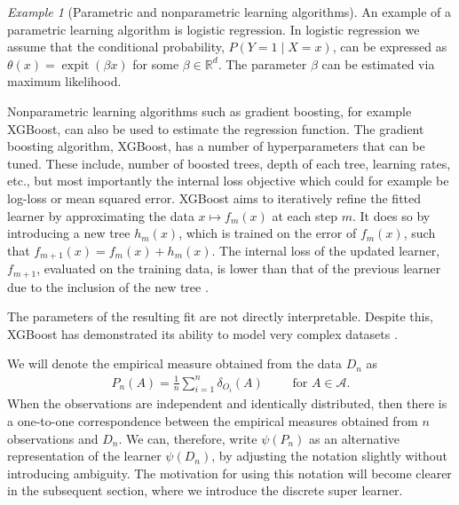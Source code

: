 \documentclass[11pt, a4paper]{article}
\theoremstyle{definition}
\theoremstyle{remark}
\newtheorem{example}{Example}
\newcommand{\btheta}{\theta}
\newcommand{\la}{\psi}
\DeclareMathOperator{\expit}{expit}
\begin{document}
\begin{example}[Parametric and nonparametric learning algorithms]
    An example of a parametric learning algorithm is logistic regression. In logistic regression we assume that the conditional probability, $ P(Y = 1 \mid X = x) $, can be expressed as $ \btheta(x) = \expit( \beta x) $ for some $ \beta \in \mathbb{R}^{d} $. The parameter $ \beta $ can be estimated via maximum likelihood.   

Nonparametric learning algorithms such as gradient boosting, for example XGBoost, can also be used to estimate the regression function. The gradient boosting algorithm, XGBoost, has a number of hyperparameters that can be tuned. These include, number of boosted trees, depth of each tree, learning rates, etc., but most importantly the internal loss objective which could for example be log-loss or mean squared error. XGBoost aims to iteratively refine the fitted learner by approximating the data $x \mapsto f_m(x)$ at each step $m$. It does so by introducing a new tree $h_m(x)$, which is trained on the error of $ f_m(x)$, such that $f_{m + 1}(x) = f_m(x) + h_m(x)$. The internal loss of the updated learner, $f_{m + 1}$, evaluated on the training data, is lower than that of the previous learner due to the inclusion of the new tree \parencite{chen2016xgboost}.

The parameters of the resulting fit are not directly interpretable. Despite this, XGBoost has demonstrated its ability to model very complex datasets \parencite{chen2016xgboost}.

\end{example}
We will denote the empirical measure obtained from the data $ D_n $ as
\begin{align*}
    P_n(A) = \frac{1}{n} \sum_{i = 1}^{n} \delta_{O_i}(A)\qquad \text{ for } A \in \mathcal{A}.
\end{align*}
When the observations are independent and identically distributed, then there is a one-to-one correspondence between the empirical measures obtained from $ n $ observations and $ D_n $. We can, therefore, write $ \la(P_n)$ as an alternative representation of the learner $\la(D_n)$, by adjusting the notation slightly without introducing ambiguity. The motivation for using this notation will become clearer in the subsequent section, where we introduce the discrete super learner.
\end{document}
